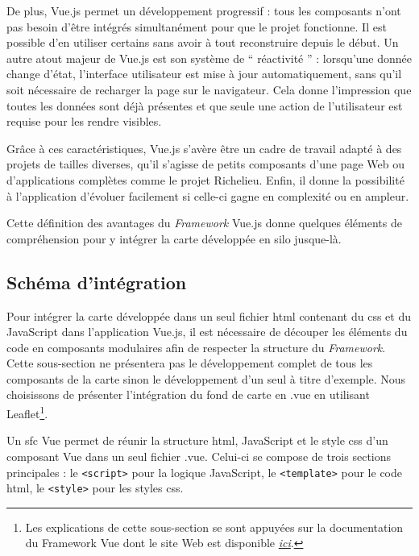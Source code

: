 De plus, Vue.js permet un développement progressif : tous les composants n'ont pas besoin d'être intégrés simultanément pour que le projet fonctionne. Il est possible d'en utiliser certains sans avoir à tout reconstruire depuis le début. Un autre atout majeur de Vue.js est son système de \enquote{ réactivité } : lorsqu'une donnée change d'état, l'interface utilisateur est mise à jour automatiquement, sans qu'il soit nécessaire de recharger la page sur le navigateur. Cela donne l'impression que toutes les données sont déjà présentes et que seule une action de l'utilisateur est requise pour les rendre visibles.

Grâce à ces caractéristiques, Vue.js s'avère être un cadre de travail adapté à des projets de tailles diverses, qu'il s'agisse de petits composants d'une page Web ou d'applications complètes comme le projet Richelieu. Enfin, il donne la possibilité à l'application d'évoluer facilement si celle-ci gagne en complexité ou en ampleur.

Cette définition des avantages du \textit{Framework} Vue.js donne quelques éléments de compréhension pour y intégrer la carte développée en silo jusque-là. 

\subsection{Schéma d'intégration}
Pour intégrer la carte développée dans un seul fichier  \acrshort{html} contenant du  \acrshort{css} et du JavaScript dans l'application Vue.js, il est nécessaire de découper les éléments du code en composants modulaires afin de respecter la structure du \textit{Framework}. Cette sous-section ne présentera pas le développement complet de tous les composants de la carte sinon le développement d'un seul à titre d'exemple. Nous choisissons de présenter l'intégration du fond de carte en .vue en utilisant Leaflet\footnote{Les explications de cette sous-section se sont appuyées sur la documentation du Framework Vue dont le site Web est disponible \textit{\href{https://fr.vuejs.org/api/sfc-script-setup}{ici}}.}. 

Un  \acrshort{sfc} Vue permet de réunir la structure   \acrshort{html}, JavaScript et le style  \acrshort{css} d'un composant Vue dans un seul fichier .vue.  Celui-ci se compose de trois sections principales  : le \texttt{<script>} pour la logique JavaScript, le \texttt{<template>} pour le code  \acrshort{html}, le \texttt{<style>} pour les styles  \acrshort{css}.

